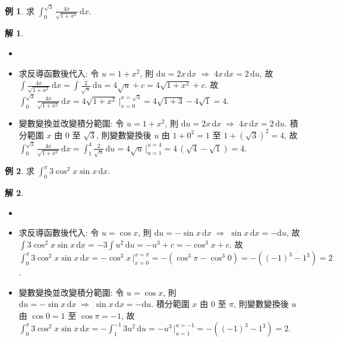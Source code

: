 \documentclass[12pt]{extarticle}
\newcommand{\ds}{\displaystyle}
\newcommand{\ie}{\;\Longrightarrow\;}
\theoremstyle{definition}
\newtheorem*{ex}{例}
\newtheorem*{sol}{解}
\begin{document}
\begin{ex}
  求 $\ds\int_0^{\sqrt{3}}\!\frac{4x}{\sqrt{1 + x^2}}\,\text{d}x$. 
\end{ex}

\begin{sol}
  \begin{itemize}\setlength{\itemsep}{0pt}
    \item[]
    \item 求反導函數後代入: 令 $\ds u = 1 + x^2$, 則 $\ds\text{d}u = 2 x\,\text{d}x\ie 4x\,\text{d}x = 2\,\text{d}u$, 故 $\ds\int\!\frac{4x}{\sqrt{1 + x^2}}\,\text{d}x = \int\!\frac{2}{\sqrt{u}}\,\text{d}u = 4\sqrt{u} + c = 4\sqrt{1 + x^2} + c$. 故 $\ds\int_0^{\sqrt{3}}\frac{4x}{\sqrt{1 + x^2}}\,\text{d}x = 4\sqrt{1 + x^2}\,\Big|_{x = 0}^{x = \sqrt{3}} = 4\sqrt{1 + 3} - 4\sqrt{1} = 4$. 
    \item 變數變換並改變積分範圍: 令 $\ds u = 1 + x^2$, 則 $\ds\text{d}u = 2 x\,\text{d}x\ie 4x\,\text{d}x = 2\,\text{d}u$. 積分範圍 $x$ 由 $0$ 至 $\sqrt{3}$, 則變數變換後 $u$ 由 $\ds1 + 0^2 = 1$ 至 $\ds1 + (\sqrt{3})^2 = 4$, 故 $\ds\int_0^{\sqrt{3}}\frac{4x}{\sqrt{1 + x^2}}\,\text{d}x = \int_1^4 \frac{2}{\sqrt{u}}\,\text{d}u = 4\sqrt{u}\,\Big|_{u = 1}^{u = 4} = 4\,(\sqrt{4} - \sqrt{1}) = 4$. 
  \end{itemize}
\end{sol}

\begin{ex}
  求 $\ds\int_0^{\pi}3\cos^2 x\sin x\,\text{d}x$. 
\end{ex}

\begin{sol}
  \begin{itemize}\setlength{\itemsep}{0pt}
    \item[]
    \item 求反導函數後代入: 令 $\ds u = \cos x$, 則 $\ds\text{d}u = -\sin x\,\text{d}x\ie \sin x\,\text{d}x = -\text{d}u$, 故 $\ds\int3\cos^2 x\sin x\,\text{d}x = -3\int u^2\,\text{d}u = -u^3 + c = -\cos^3 x + c$. 故 $\ds\int_0^{\pi}3\cos^2 x\sin x\,\text{d}x = -\cos^3 x\,\Big|_{x = 0}^{x = \pi} = -(\cos^3\pi - \cos^3 0) = -((-1)^3 - 1^3) = 2$. 
    \item 變數變換並改變積分範圍: 令 $\ds u = \cos x$, 則 $\ds\text{d}u = -\sin x\,\text{d}x\ie \sin x\,\text{d}x = -\text{d}u$. 積分範圍 $x$ 由 $0$ 至 $\pi$, 則變數變換後 $u$ 由 $\ds\cos 0 = 1$ 至 $\ds\cos\pi= -1$, 故 $\ds\int_0^{\pi}3\cos^2 x\sin x\,\text{d}x = -\int_{1}^{-1}3u^2\,\text{d}u = -u^3\,\Big|_{u = 1}^{u = -1} = -((-1)^3 - 1^3) = 2$. 
  \end{itemize}
\end{sol}
\end{document}
